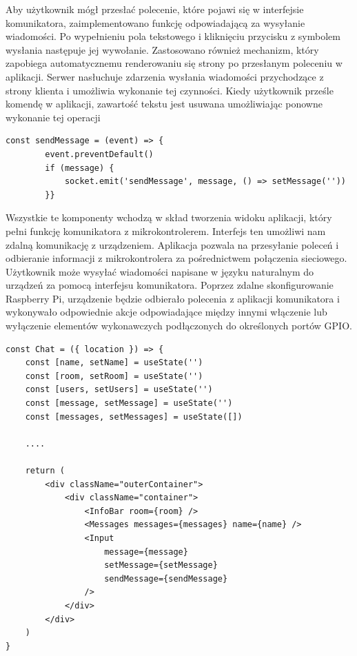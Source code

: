 Aby użytkownik mógł przesłać polecenie, które pojawi się w interfejsie komunikatora, zaimplementowano funkcję odpowiadającą za wysyłanie wiadomości. Po wypełnieniu pola tekstowego i kliknięciu przycisku z symbolem wysłania następuje jej wywołanie. Zastosowano również mechanizm, który zapobiega automatycznemu renderowaniu się strony po przesłanym poleceniu w aplikacji. Serwer nasłuchuje zdarzenia wysłania wiadomości przychodzące z strony klienta i umożliwia wykonanie tej czynności. Kiedy użytkownik prześle komendę w aplikacji, zawartość tekstu jest usuwana umożliwiając ponowne wykonanie tej operacji
\begin{lstlisting}[caption=Implementacja funkcji do wysylania wiadomosci]
const sendMessage = (event) => {
        event.preventDefault()
        if (message) {
            socket.emit('sendMessage', message, () => setMessage(''))
       	}}
\end{lstlisting}

Wszystkie te komponenty wchodzą w skład tworzenia widoku aplikacji, który pełni funkcję komunikatora z mikrokontrolerem. Interfejs ten umożliwi nam zdalną komunikację z urządzeniem. Aplikacja pozwala na przesyłanie poleceń i odbieranie informacji z mikrokontrolera za pośrednictwem połączenia sieciowego. Użytkownik może wysyłać wiadomości napisane w języku naturalnym do urządzeń za pomocą interfejsu komunikatora. Poprzez zdalne skonfigurowanie Raspberry Pi, urządzenie będzie odbierało polecenia z aplikacji komunikatora i wykonywało odpowiednie akcje odpowiadające między innymi włączenie lub wyłączenie elementów wykonawczych podłączonych do określonych portów GPIO.
\begin{lstlisting}[caption=Implementacja komponentu czatu]
const Chat = ({ location }) => {
    const [name, setName] = useState('')
    const [room, setRoom] = useState('')
    const [users, setUsers] = useState('')
    const [message, setMessage] = useState('')
    const [messages, setMessages] = useState([])

	....	

    return (
        <div className="outerContainer">
            <div className="container">
                <InfoBar room={room} />
                <Messages messages={messages} name={name} />
                <Input
                    message={message}
                    setMessage={setMessage}
                    sendMessage={sendMessage}
                />
            </div>
        </div>
    )
}
\end{lstlisting}
